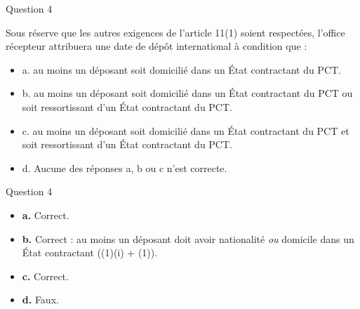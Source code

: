 \begin{frame}{Question 4}

\begin{block}{}
Sous réserve que les autres exigences de l’article 11(1) soient respectées,
l’office récepteur attribuera une date de dépôt international à condition que :

\begin{itemize}
  \item[$\bullet$] a. au moins un déposant soit domicilié dans un État contractant du PCT. 
  \item[$\bullet$] b. au moins un déposant soit domicilié dans un État contractant du PCT ou soit 
  ressortissant d’un État contractant du PCT. 
  \item[$\bullet$] c. au moins un déposant soit domicilié dans un État contractant du PCT et soit 
  ressortissant d’un État contractant du PCT. 
  \item[$\circ$] d. Aucune des réponses a, b ou c n’est correcte. 
\end{itemize}

\end{block}

\end{frame}

\begin{frame}{Question 4}

\begin{itemize}
  \item[$\circ$] \textbf{a.} \; Correct.

  \item[$\bullet$] \textbf{b.} \; Correct : au moins un déposant doit avoir
  nationalité \emph{ou} domicile dans un État contractant
  ((1)(i) + (1)).

  \item[$\circ$] \textbf{c.} \; Correct.

  \item[$\circ$] \textbf{d.} \; Faux.
\end{itemize}

\end{frame}

